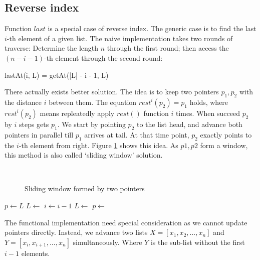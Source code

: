 \documentclass[b5paper]{article}
\begin{document}
\subsection{Reverse index}
 
Function $last$ is a special case of reverse index. The generic case is to find the last $i$-th element of a given list. The naive implementation takes two rounds of traverse: Determine the length $n$ through the first round; then access the $(n - i - 1)$-th element through the second round:

\be
  lastAt(i, L) = getAt(|L| - i - 1, L)
\ee

There actually exists better solution. The idea is to keep two pointers $p_1, p_2$ with the distance $i$ between them. The equation $rest^i(p_2) = p_1$ holds, where $rest^i(p_2)$ means repleatedly apply $rest()$ function $i$ times. When succeed $p_2$ by $i$ steps gets $p_1$. We start by pointing $p_2$ to the list head, and advance both pointers in parallel till $p_1$ arrives at tail. At that time point, $p_2$ exactly points to the $i$-th element from right. Figure \ref{fig:list-rindex} shows this idea. As $p1, p2$ form a window, this method is also called `sliding window' solution.

\begin{figure}[htbp]
  \centering
   \\
  \caption{Sliding window formed by two pointers} \label{fig:list-rindex}
\end{figure}

\begin{algorithmic}[1]
  \State $p \gets L$
    \State $L \gets $  
    \State $i \gets i - 1$
  \EndWhile
    \State $L \gets$ 
    \State $p \gets$ 
  \EndWhile
  \State \Return {}
\EndFunction
\end{algorithmic}

The functional implementation need special consideration as we cannot update pointers directly. Instead, we advance two lists $X = [x_1, x_2, ..., x_n]$ and $Y = [x_i, x_{i+1}, ..., x_n]$ simultaneously. Where $Y$ is the sub-list without the first $i - 1$ elements.
\end{document}
